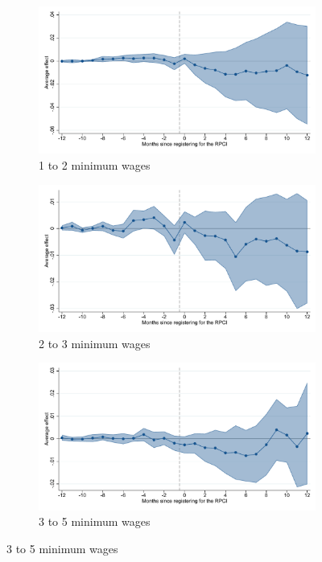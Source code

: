 \begin{figure}[H]
    \begin{subfigure}{0.32\textwidth}
    \caption{1 to 2 minimum wages}
    \includegraphics[width=\textwidth]{04_Figures/muestra_10porciento/event_study_alta_sal_min_1_2_dcdh_connected.pdf}
    \end{subfigure}
    \begin{subfigure}{0.32\textwidth}
    \caption{2 to 3 minimum wages}
    \includegraphics[width=\textwidth]{04_Figures/muestra_10porciento/event_study_alta_sal_min_2_3_dcdh_connected.pdf}
    \end{subfigure}
    \begin{subfigure}{0.32\textwidth}
    \caption{3 to 5 minimum wages}
    \includegraphics[width=\textwidth]{04_Figures/muestra_10porciento/event_study_alta_sal_min_3_5_dcdh_connected.pdf}
    \end{subfigure}


\end{figure}
